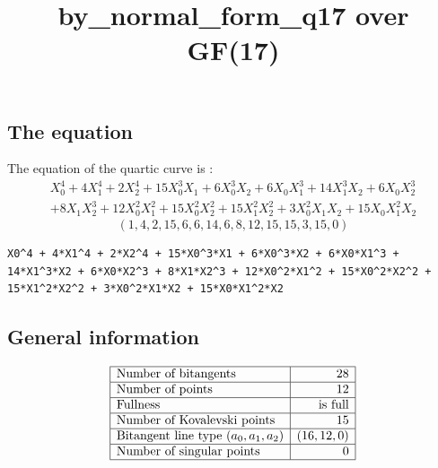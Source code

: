 \documentclass{article}
\newcommand\setTBstruts{\def\T{\rule{0pt}{2.6ex}}%
\def\B{\rule[-1.2ex]{0pt}{0pt}}}
\begin{document}
 
\setTBstruts



{\allowdisplaybreaks%






\title{by\_normal\_form\_q17 over GF(17)}
\author{}%
\maketitle%
%



\subsection*{The equation}
The equation of the quartic curve  is :
$$
\begin{array}{c}
X_0^4 + 4X_1^4 + 2X_2^4 + 15X_0^3X_1 + 6X_0^3X_2 + 6X_0X_1^3 + 14X_1^3X_2 + 6X_0X_2^3\\
 + 8X_1X_2^3 + 12X_0^2X_1^2 + 15X_0^2X_2^2 + 15X_1^2X_2^2 + 3X_0^2X_1X_2 + 15X_0X_1^2X_2\end{array}
$$
$$
( 1, 4, 2, 15, 6, 6, 14, 6, 8, 12, 15, 15, 3, 15, 0 )$$
\begin{verbatim}
X0^4 + 4*X1^4 + 2*X2^4 + 15*X0^3*X1 + 6*X0^3*X2 + 6*X0*X1^3 + 14*X1^3*X2 + 6*X0*X2^3 + 8*X1*X2^3 + 12*X0^2*X1^2 + 15*X0^2*X2^2 + 15*X1^2*X2^2 + 3*X0^2*X1*X2 + 15*X0*X1^2*X2
\end{verbatim}
\subsection*{General information}
{\renewcommand{\arraystretch}{1.5}
$$
\begin{array}{|l|r|}
\hline
\mbox{Number of bitangents} & 28\\
\hline
\mbox{Number of points} & 12\\
\hline
\mbox{Fullness} &  \mbox{is full}\\
\hline
\mbox{Number of Kovalevski points} & 15\\
\hline
\mbox{Bitangent line type $(a_0,a_1,a_2)$} & (16,
12,
0)\\
\hline
\mbox{Number of singular points} & 0\\
\hline
\end{array}
$$}
}
\end{document}
